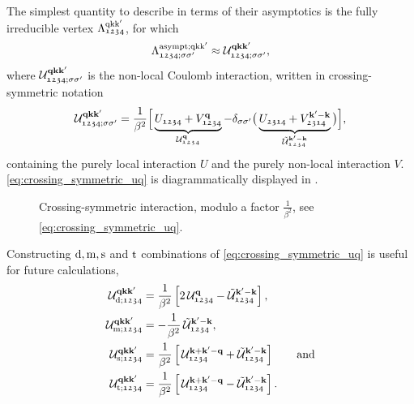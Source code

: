 \documentclass[../../main.tex]{subfiles}
\begin{document}
The simplest quantity to describe in terms of their asymptotics is the fully irreducible vertex $\Lambda^{\text{q}\text{k}\text{k}'}_{\mathfrak{1234}}$, for which
\begin{align}
	\Lambda^{\text{asympt};\text{q}\text{k}\text{k}'}_{\mathfrak{1234};\sigma\sigma'}\approx\mathcal{U}^{\textbf{qkk}'}_{\mathfrak{1234};\sigma\sigma'},
\end{align}
where $\mathcal{U}^{\textbf{qkk}'}_{\mathfrak{1234};\sigma\sigma'}$ is the non-local Coulomb interaction, written in crossing-symmetric notation
\begin{align}\label{eq:crossing_symmetric_uq}
	 \mathcal{U}^{\textbf{qkk}'}_{\mathfrak{1234};\sigma\sigma'}=\frac{1}{\beta^2}\Big[\underbrace{U_{\mathfrak{1234}}+V^{\textbf{q}}_{\mathfrak{1234}}}_{\mathcal{U}^{\textbf{q}}_{\mathfrak{1234}}}-\delta_{\sigma\sigma'}\big (\underbrace{U_{\mathfrak{2314}}+V^{\textbf{k}'-\textbf{k}}_{\mathfrak{2314}}}_{\tilde{\mathcal{U}}^{\textbf{k}'-\textbf{k}}_{\mathfrak{1234}}}\big )\Big],
\end{align}
containing the purely local interaction $U$ and the purely non-local interaction $V$. \eqref{eq:crossing_symmetric_uq} is diagrammatically displayed in .
\begin{figure}[ht!]
	\centering
	
	\caption{Crossing-symmetric interaction, modulo a factor $\frac{1}{\beta^2}$, see \eqref{eq:crossing_symmetric_uq}.}
	\label{fig:bare_vertex_crossing_symmetric}
\end{figure}
Constructing $\text{d},\text{m},\text{s}$ and $\text{t}$ combinations of \eqref{eq:crossing_symmetric_uq} is useful for future calculations,
\begin{subequations}
\begin{align}
	\mathcal{U}^{\textbf{qkk}'}_{\text{d};\mathfrak{1234}}&=\frac{1}{\beta^2}\left [2\,\mathcal{U}^{\textbf{q}}_{\mathfrak{1234}} - \tilde{\mathcal{U}}^{\textbf{k}'-\textbf{k}}_{\mathfrak{1234}}\right ],\\
	\mathcal{U}^{\textbf{qkk}'}_{\text{m};\mathfrak{1234}}&=-\frac{1}{\beta^2}\,\tilde{\mathcal{U}}^{\textbf{k}'-\textbf{k}}_{\mathfrak{1234}},\\
	\mathcal{U}^{\textbf{qkk}'}_{\text{s};\mathfrak{1234}}&=\frac{1}{\beta^2}\left [\,\mathcal{U}^{\textbf{k}+\textbf{k}'-\textbf{q}}_{\mathfrak{1234}}+\tilde{\mathcal{U}}^{\textbf{k}'-\textbf{k}}_{\mathfrak{1234}}\right ]\qquad\text{and}\\
	\mathcal{U}^{\textbf{qkk}'}_{\text{t};\mathfrak{1234}}&=\frac{1}{\beta^2}\left [\,\mathcal{U}^{\textbf{k}+\textbf{k}'-\textbf{q}}_{\mathfrak{1234}}-\tilde{\mathcal{U}}^{\textbf{k}'-\textbf{k}}_{\mathfrak{1234}}\right ].
\end{align}
\end{subequations}
\end{document}
